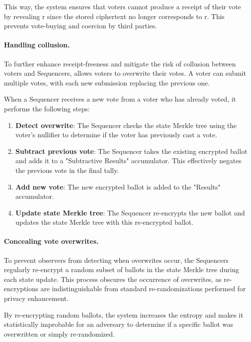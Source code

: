 This way, the system ensures that voters cannot produce a receipt of their vote by revealing r since the stored ciphertext no longer corresponds to r. This prevents vote-buying and coercion by third parties.

\paragraph{Handling collusion.}

To further enhance receipt-freeness and mitigate the risk of collusion between voters and Sequencers, \davinci allows voters to overwrite their votes. A voter can submit multiple votes, with each new submission replacing the previous one.

When a Sequencer receives a new vote from a voter who has already voted, it performs the following steps:

\begin{enumerate}
	\item \textbf{Detect overwrite}: The Sequencer checks the state Merkle tree using the voter's nullifier to determine if the voter has previously cast a vote.
	\item \textbf{Subtract previous vote}: The Sequencer takes the existing encrypted ballot and adds it to a "Subtractive Results" accumulator. This effectively negates the previous vote in the final tally.
	\item \textbf{Add new vote}: The new encrypted ballot is added to the "Results" accumulator.
	\item \textbf{Update state Merkle tree}: The Sequencer re-encrypts the new ballot and updates the state Merkle tree with this re-encrypted ballot.
\end{enumerate}

\paragraph{Concealing vote overwrites.}

To prevent observers from detecting when overwrites occur, the Sequencers regularly re-encrypt a random subset of ballots in the state Merkle tree during each state update. This process obscures the occurrence of overwrites, as re-encryptions are indistinguishable from standard re-randomizations performed for privacy enhancement.

By re-encrypting random ballots, the system increases the entropy and makes it statistically improbable for an adversary to determine if a specific ballot was overwritten or simply re-randomized.

